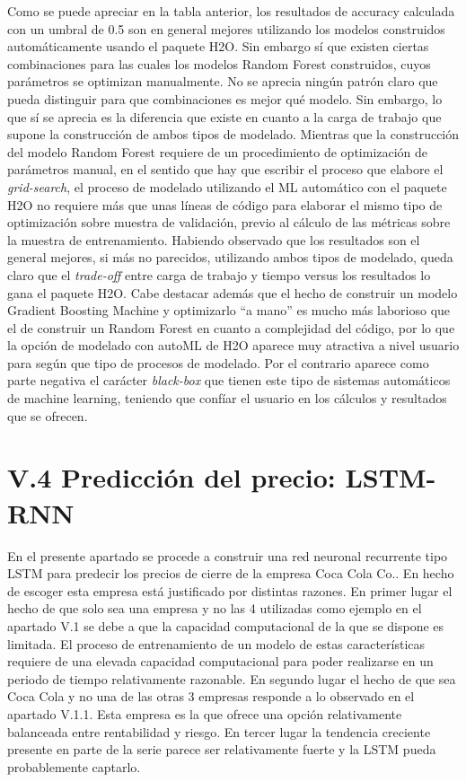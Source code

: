 \documentclass[]{DissertateUSU}
\begin{document}
\setlength\parskip{5ex}
\justifying

\noindent Como se puede apreciar en la tabla anterior, los resultados de
accuracy calculada con un umbral de 0.5 son en general mejores
utilizando los modelos construidos automáticamente usando el paquete
H2O. Sin embargo sí que existen ciertas combinaciones para las cuales
los modelos Random Forest construidos, cuyos parámetros se optimizan
manualmente. No se aprecia ningún patrón claro que pueda distinguir para
que combinaciones es mejor qué modelo. Sin embargo, lo que sí se aprecia
es la diferencia que existe en cuanto a la carga de trabajo que supone
la construcción de ambos tipos de modelado. Mientras que la construcción
del modelo Random Forest requiere de un procedimiento de optimización de
parámetros manual, en el sentido que hay que escribir el proceso que
elabore el \emph{grid-search}, el proceso de modelado utilizando el ML
automático con el paquete H2O no requiere más que unas líneas de código
para elaborar el mismo tipo de optimización sobre muestra de validación,
previo al cálculo de las métricas sobre la muestra de entrenamiento.
Habiendo observado que los resultados son el general mejores, si más no
parecidos, utilizando ambos tipos de modelado, queda claro que el
\emph{trade-off} entre carga de trabajo y tiempo versus los resultados
lo gana el paquete H2O. Cabe destacar además que el hecho de construir
un modelo Gradient Boosting Machine y optimizarlo ``a mano'' es mucho
más laborioso que el de construir un Random Forest en cuanto a
complejidad del código, por lo que la opción de modelado con autoML de
H2O aparece muy atractiva a nivel usuario para según que tipo de
procesos de modelado. Por el contrario aparece como parte negativa el
carácter \emph{black-box} que tienen este tipo de sistemas automáticos
de machine learning, teniendo que confíar el usuario en los cálculos y
resultados que se ofrecen.

\FloatBarrier
{}
\fancyfoot[C]{\thepage}

\section{V.4 \textbf{Predicción del precio: LSTM-RNN}}

\noindent En el presente apartado se procede a construir una red
neuronal recurrente tipo LSTM para predecir los precios de cierre de la
empresa Coca Cola Co.. En hecho de escoger esta empresa está justificado
por distintas razones. En primer lugar el hecho de que solo sea una
empresa y no las 4 utilizadas como ejemplo en el apartado V.1 se debe a
que la capacidad computacional de la que se dispone es limitada. El
proceso de entrenamiento de un modelo de estas características requiere
de una elevada capacidad computacional para poder realizarse en un
periodo de tiempo relativamente razonable. En segundo lugar el hecho de
que sea Coca Cola y no una de las otras 3 empresas responde a lo
observado en el apartado V.1.1. Esta empresa es la que ofrece una opción
relativamente balanceada entre rentabilidad y riesgo. En tercer lugar la
tendencia creciente presente en parte de la serie parece ser
relativamente fuerte y la LSTM pueda probablemente captarlo.
\end{document}
